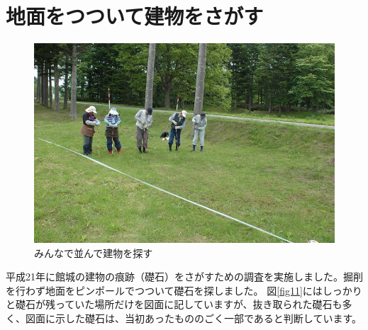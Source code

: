 \documentclass[11pt,report]{jsbook}
\begin{document}
\section{地面をつついて建物をさがす}
\begin{figure}
\vspace*{-\intextsep} 
\centering
\includegraphics[width=15zw]{fig/14.JPG}
\caption{みんなで並んで建物を探す}
\label{fig14}
\end{figure}

平成21年に館城の建物の痕跡（礎石）をさがすための調査を実施しました。掘削を行わず地面をピンポールでつついて礎石を探しました。
図\ref{fig11}にはしっかりと礎石が残っていた場所だけを図面に記していますが、抜き取られた礎石も多く、図面に示した礎石は、当初あったもののごく一部であると判断しています。
\end{document}
